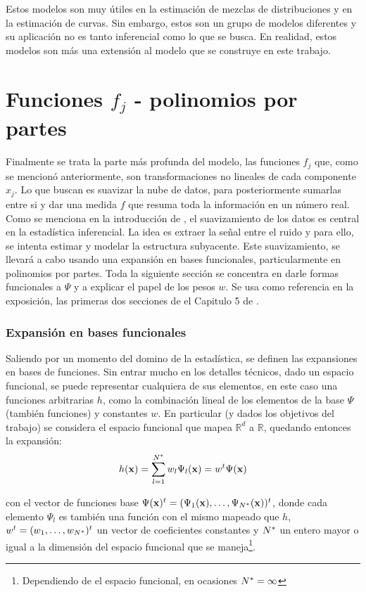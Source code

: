 \documentclass[../Main/Main.tex]{subfiles}
\begin{document}
Estos modelos son muy útiles en la estimación de mezclas de distribuciones y en la estimación de curvas. Sin embargo, estos son un grupo de modelos diferentes y su aplicación no es tanto inferencial como lo que se busca. En realidad, estos modelos son más una extensión al modelo que se construye en este trabajo.

\section{Funciones $f_j$ - polinomios por partes} \label{sec:fj}
Finalmente se trata la parte más profunda del modelo, las funciones $f_j$  que, como se mencionó anteriormente, son transformaciones no lineales de cada componente $x_j$. Lo que buscan es suavizar la nube de datos, para posteriormente sumarlas entre si y dar una medida $f$ que resuma toda la información en un número real. Como se menciona en la introducción de \citet{hardle2004semiparametric}, el suavizamiento de los datos es central en la estadística inferencial. La idea es extraer la señal entre el ruido y para ello, se intenta estimar y modelar la estructura subyacente. Este suavizamiento, se llevará a cabo usando una expansión en bases funcionales, particularmente en polinomios por partes. Toda la siguiente sección se concentra en darle formas funcionales a $\Psi$ y a explicar el papel de los pesos $w$. Se usa como referencia en la exposición, las primeras dos secciones de el Capitulo 5 de \citet{hastie2008elements}.

\subsubsection{Expansión en bases funcionales}
Saliendo por un momento del domino de la estadística, se definen las expansiones en bases de funciones. Sin entrar mucho en los detalles técnicos, dado un espacio funcional, se puede representar cualquiera de sus elementos, en este caso una funciones arbitrarias $h$, como la combinación lineal de los elementos de la base $\Psi$ (también funciones) y constantes $w$. En particular (y dados los objetivos del trabajo) se considera el espacio funcional que mapea $\mathbb{R}^d$ a $\mathbb{R}$, quedando entonces la expansión: 
\begin{align} 
	h(\mathbf{x}) = \sum_{l = 1}^{N^*} w_l\Psi_l(\mathbf{x}) = w^t\Psi(\mathbf{x}) \label{ec:ExpansionBases2}
\end{align}

con el vector de funciones base $\Psi(\mathbf{x})^t = (\Psi_1(\mathbf{x}),\ldots,\Psi_{N^*}(\mathbf{x}))^t$, donde cada elemento $\Psi_l$ es también una función con el mismo mapeado que $h$, $w^t = (w_1,\ldots,w_{N^*})^t$  un vector de coeficientes constantes y $N^*$ un entero mayor o igual a la dimensión del espacio funcional que se maneja\footnote{Dependiendo de el espacio funcional, en ocasiones $N^* = \infty$}.
\end{document}
